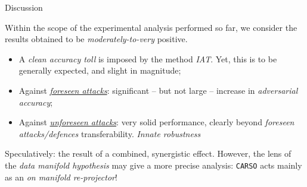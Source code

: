 
\begin{frame}{ Discussion}

    Within the scope of the experimental analysis performed so far, we consider the results obtained to be \textit{moderately-to-very} \alert{positive}.

    \begin{itemize}
        \item A \textit{clean accuracy \alert{toll}} is imposed by the method \wrt \textit{IAT}. Yet, this is to be generally expected, and slight in magnitude;
        \item Against \underline{\textit{foreseen attacks}}: significant -- but not large -- increase in \textit{adversarial accuracy};
        \item Against \underline{\textit{unforeseen attacks}}: very solid performance, clearly beyond \textit{foreseen attacks/defences} transferability. \textit{Innate robustness}
    \end{itemize}

Speculatively: the result of a combined, synergistic effect. However, the lens of the \textit{data manifold hypothesis} may give a more precise analysis: \texttt{CARSO} acts mainly as an \textit{on manifold re-projector}!
\end{frame}